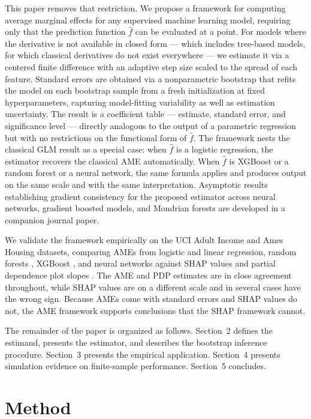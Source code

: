 \documentclass[conference]{IEEEtran}
\begin{document}
	This paper removes that restriction. We propose a framework for computing average marginal effects for any supervised machine learning model, requiring only that the prediction function $\hat{f}$ can be evaluated at a point. For models where the derivative is not available in closed form --- which includes tree-based models, for which classical derivatives do not exist everywhere --- we estimate it via a centered finite difference with an adaptive step size scaled to the spread of each feature. Standard errors are obtained via a nonparametric bootstrap \cite{efron1979, efrontibshirani1993} that refits the model on each bootstrap sample from a fresh initialization at fixed hyperparameters, capturing model-fitting variability as well as estimation uncertainty. The result is a coefficient table --- estimate, standard error, and significance level --- directly analogous to the output of a parametric regression but with no restrictions on the functional form of $\hat{f}$. The framework nests the classical GLM result as a special case: when $\hat{f}$ is a logistic regression, the estimator recovers the classical AME automatically. When $\hat{f}$ is XGBoost or a random forest or a neural network, the same formula applies and produces output on the same scale and with the same interpretation. Asymptotic results establishing gradient consistency for the proposed estimator across neural networks, gradient boosted models, and Mondrian forests are developed in a companion journal paper.
	
	We validate the framework empirically on the UCI Adult Income \cite{kohavi1996, UCI} and Ames Housing \cite{decock2011} datasets, comparing AMEs from logistic and linear regression, random forests \cite{breiman2001rf}, XGBoost \cite{chen2016xgboost}, and neural networks against SHAP values \cite{lundberg2017shap} and partial dependence plot slopes \cite{friedman2001pdp}. The AME and PDP estimates are in close agreement throughout, while SHAP values are on a different scale and in several cases have the wrong sign. Because AMEs come with standard errors and SHAP values do not, the AME framework supports conclusions that the SHAP framework cannot.
	
	The remainder of the paper is organized as follows. Section~2 defines the estimand, presents the estimator, and describes the bootstrap inference procedure. Section~3 presents the empirical application. Section~4 presents simulation evidence on finite-sample performance. Section~5 concludes.
	
	\section{Method}
	
\end{document}
